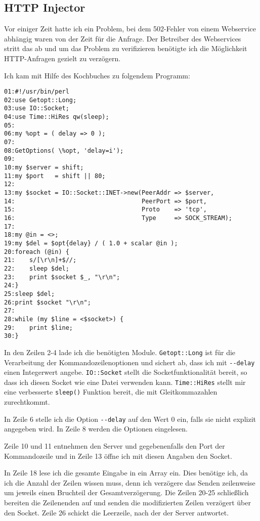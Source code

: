 \begin{normaltext}
  \subsection*{HTTP Injector}

  Vor einiger Zeit hatte ich ein Problem, bei dem 502-Fehler von
  einem Webservice abhängig waren von der Zeit für die
  Anfrage. Der Betreiber des Webservices stritt das ab und um das
  Problem zu verifizieren benötigte ich die Möglichkeit HTTP-Anfragen gezielt
  zu verzögern.
  
  Ich kam mit Hilfe des Kochbuches zu folgendem Programm:
  \begin{verbatim}
01:#!/usr/bin/perl
02:use Getopt::Long;
03:use IO::Socket;
04:use Time::HiRes qw(sleep);
05:
06:my %opt = ( delay => 0 );
07:
08:GetOptions( \%opt, 'delay=i');
09:
10:my $server = shift;
11:my $port   = shift || 80;
12:
13:my $socket = IO::Socket::INET->new(PeerAddr => $server,
14:                                   PeerPort => $port,
15:                                   Proto    => 'tcp',
16:                                   Type     => SOCK_STREAM);
17:
18:my @in = <>;
19:my $del = $opt{delay} / ( 1.0 + scalar @in );
20:foreach (@in) {
21:    s/[\r\n]+$//;
22:    sleep $del;
23:    print $socket $_, "\r\n";
24:}
25:sleep $del;
26:print $socket "\r\n";
27:
28:while (my $line = <$socket>) {
29:    print $line;
30:}
  \end{verbatim}
  In den Zeilen 2-4 lade ich die benötigten Module. \verb?Getopt::Long? ist
  für die Verarbeitung der Kommandozeilenoptionen und sichert ab, dass ich mit
  \verb?--delay? einen Integerwert angebe. \verb?IO::Socket? stellt die
  Socketfunktionalität bereit, so dass ich diesen Socket wie eine Datei
  verwenden kann. \verb?Time::HiRes? stellt mir eine verbesserte
  \verb?sleep()? Funktion bereit, die mit Gleitkommazahlen zurechtkommt.

  In Zeile 6 stelle ich die Option \verb?--delay? auf den Wert 0 ein, falls
  sie nicht explizit angegeben wird. In Zeile 8 werden die Optionen
  eingelesen.

  Zeile 10 und 11 entnehmen den Server und gegebenenfalls den Port der
  Kommandozeile und in Zeile 13 öffne ich mit diesen Angaben den Socket.

  In Zeile 18 lese ich die gesamte Eingabe in ein Array ein. Dies benötige
  ich, da ich die Anzahl der Zeilen wissen muss, denn ich verzögere das Senden
  zeilenweise um jeweils einen Bruchteil der Gesamtverzögerung. Die Zeilen
  20-25 schließlich bereiten die Zeilenenden auf und senden die modifizierten
  Zeilen verzögert über den Socket. Zeile 26 schickt die Leerzeile, nach der
  der Server antwortet.


\end{normaltext}
